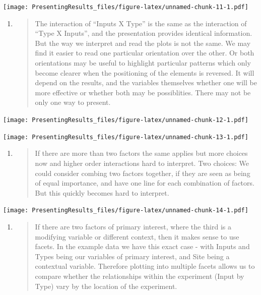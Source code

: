 \documentclass[
]{book}
\begin{document}
\texttt{[image: PresentingResults\_files/figure-latex/unnamed-chunk-11-1.pdf]}

\begin{enumerate}
\def\labelenumi{\arabic{enumi}.}
\setcounter{enumi}{3}
\item
  \begin{quote}
  The interaction of ``Inputs X Type'' is the same as the interaction of ``Type X Inputs'', and the presentation provides identical information. But the way we interpret and read the plots is not the same. We may find it easier to read one particular orientation over the other. Or both orientations may be useful to highlight particular patterns which only become clearer when the positioning of the elements is reversed. It will depend on the results, and the variables themselves whether one will be more effective or whether both may be possiblities. There may not be only one way to present.
  \end{quote}
\end{enumerate}

\texttt{[image: PresentingResults\_files/figure-latex/unnamed-chunk-12-1.pdf]}

\texttt{[image: PresentingResults\_files/figure-latex/unnamed-chunk-13-1.pdf]}

\begin{enumerate}
\def\labelenumi{\arabic{enumi}.}
\setcounter{enumi}{4}
\item
  \begin{quote}
  If there are more than two factors the same applies but more choices now and higher order interactions hard to interpret. Two choices:
  We could consider combing two factors together, if they are seen as being of equal importance, and have one line for each combination of factors. But this quickly becomes hard to interpret.
  \end{quote}
\end{enumerate}

\texttt{[image: PresentingResults\_files/figure-latex/unnamed-chunk-14-1.pdf]}

\begin{enumerate}
\def\labelenumi{\arabic{enumi}.}
\setcounter{enumi}{5}
\item
  \begin{quote}
  If there are two factors of primary interest, where the third is a modifying variable or different context, then it makes sense to use facets. In the example data we have this exact case - with Inputs and Types being our variables of primary interest, and Site being a contextual variable. Therefore plotting into multiple facets allows us to compare whether the relationships within the experiment (Input by Type) vary by the location of the experiment.
  \end{quote}
\end{enumerate}
\end{document}
